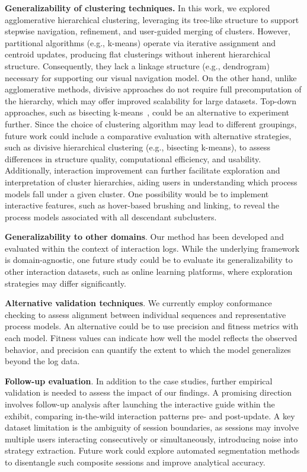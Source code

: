 \documentclass[preprint,journal]{vgtc}            %
\begin{document}
\noindent
\textbf{Generalizability of clustering techniques.} 
In this work, we explored agglomerative hierarchical clustering, leveraging its tree-like structure to support stepwise navigation, refinement, and user-guided merging of clusters.
However, partitional algorithms (e.g., k-means) operate via iterative assignment and centroid updates, producing flat clusterings without inherent hierarchical structure.
Consequently, they lack a linkage structure (e.g., dendrogram) necessary for supporting our visual navigation model.
On the other hand, unlike agglomerative methods, divisive approaches do not require full precomputation of the hierarchy, which may offer improved scalability for large datasets.
Top-down approaches, such as bisecting k-means~\cite{Savaresi04Comparative}, could be an alternative to experiment further.
Since the choice of clustering algorithm may lead to different groupings, future work could include a comparative evaluation with alternative strategies, such as divisive hierarchical clustering (e.g., bisecting k-means), to assess differences in structure quality, computational efficiency, and usability.
Additionally, interaction improvement can further facilitate exploration and interpretation of cluster hierarchies, aiding users in understanding which process models fall under a given cluster.
One possibility would be to implement interactive features, such as hover-based brushing and linking, to reveal the process models associated with all descendant subclusters.

\noindent
\textbf{Generalizability to other domains}.
Our method has been developed and evaluated within the context of interaction logs.
While the underlying framework is domain-agnostic, one future study could be to evaluate its generalizability to other interaction datasets, such as online learning platforms, where exploration strategies may differ significantly.

\noindent
\textbf{Alternative validation techniques}.
We currently employ conformance checking to assess alignment between individual sequences and representative process models.
An alternative could be to use precision and fitness metrics with each model.
Fitness values can indicate how well the model reflects the observed behavior, and precision can quantify the extent to which the model generalizes beyond the log data.

\noindent
\textbf{Follow-up evaluation}.
In addition to the case studies, further empirical validation is needed to assess the impact of our findings.
A promising direction involves follow-up analysis after launching the interactive guide within the exhibit, comparing in-the-wild interaction patterns pre- and post-update.
A key dataset limitation is the ambiguity of session boundaries, as sessions may involve multiple users interacting consecutively or simultaneously, introducing noise into strategy extraction.
Future work could explore automated segmentation methods to disentangle such composite sessions and improve analytical accuracy.
\end{document}
